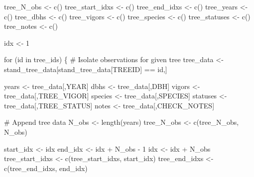 \documentclass[
  letterpaper,
  DIV=11,
  numbers=noendperiod]{scrartcl}
\newenvironment{Shaded}{\begin{snugshade}}{\end{snugshade}}
\newcommand{\CommentTok}[1]{\textcolor[rgb]{0.37,0.37,0.37}{#1}}
\newcommand{\ControlFlowTok}[1]{\textcolor[rgb]{0.00,0.23,0.31}{#1}}
\newcommand{\DecValTok}[1]{\textcolor[rgb]{0.68,0.00,0.00}{#1}}
\newcommand{\FunctionTok}[1]{\textcolor[rgb]{0.28,0.35,0.67}{#1}}
\newcommand{\NormalTok}[1]{\textcolor[rgb]{0.00,0.23,0.31}{#1}}
\newcommand{\OtherTok}[1]{\textcolor[rgb]{0.00,0.23,0.31}{#1}}
\newcommand{\SpecialCharTok}[1]{\textcolor[rgb]{0.37,0.37,0.37}{#1}}
\newcommand{\StringTok}[1]{\textcolor[rgb]{0.13,0.47,0.30}{#1}}
\begin{document}
\begin{Shaded}
\begin{Highlighting}[]
\NormalTok{tree\_N\_obs }\OtherTok{\textless{}{-}} \FunctionTok{c}\NormalTok{()}
\NormalTok{tree\_start\_idxs }\OtherTok{\textless{}{-}} \FunctionTok{c}\NormalTok{()}
\NormalTok{tree\_end\_idxs }\OtherTok{\textless{}{-}} \FunctionTok{c}\NormalTok{()}
\NormalTok{tree\_years }\OtherTok{\textless{}{-}} \FunctionTok{c}\NormalTok{()}
\NormalTok{tree\_dbhs }\OtherTok{\textless{}{-}} \FunctionTok{c}\NormalTok{()}
\NormalTok{tree\_vigors }\OtherTok{\textless{}{-}} \FunctionTok{c}\NormalTok{()}
\NormalTok{tree\_species }\OtherTok{\textless{}{-}} \FunctionTok{c}\NormalTok{()}
\NormalTok{tree\_statuses }\OtherTok{\textless{}{-}} \FunctionTok{c}\NormalTok{()}
\NormalTok{tree\_notes }\OtherTok{\textless{}{-}} \FunctionTok{c}\NormalTok{()}

\NormalTok{idx }\OtherTok{\textless{}{-}} \DecValTok{1}

\ControlFlowTok{for}\NormalTok{ (id }\ControlFlowTok{in}\NormalTok{ tree\_ids) \{}
  \CommentTok{\# Isolate observations for given tree}
\NormalTok{  tree\_data }\OtherTok{\textless{}{-}}\NormalTok{ stand\_tree\_data[stand\_tree\_data[}\StringTok{\textquotesingle{}TREEID\textquotesingle{}}\NormalTok{] }\SpecialCharTok{==}\NormalTok{ id,]}

\NormalTok{  years }\OtherTok{\textless{}{-}}\NormalTok{ tree\_data[,}\StringTok{\textquotesingle{}YEAR\textquotesingle{}}\NormalTok{]}
\NormalTok{  dbhs }\OtherTok{\textless{}{-}}\NormalTok{ tree\_data[,}\StringTok{\textquotesingle{}DBH\textquotesingle{}}\NormalTok{]}
\NormalTok{  vigors }\OtherTok{\textless{}{-}}\NormalTok{ tree\_data[,}\StringTok{\textquotesingle{}TREE\_VIGOR\textquotesingle{}}\NormalTok{]}
\NormalTok{  species }\OtherTok{\textless{}{-}}\NormalTok{ tree\_data[,}\StringTok{\textquotesingle{}SPECIES\textquotesingle{}}\NormalTok{]}
\NormalTok{  statuses }\OtherTok{\textless{}{-}}\NormalTok{ tree\_data[,}\StringTok{\textquotesingle{}TREE\_STATUS\textquotesingle{}}\NormalTok{]}
\NormalTok{  notes }\OtherTok{\textless{}{-}}\NormalTok{ tree\_data[,}\StringTok{\textquotesingle{}CHECK\_NOTES\textquotesingle{}}\NormalTok{]}

  \CommentTok{\# Append tree data}
\NormalTok{  N\_obs }\OtherTok{\textless{}{-}} \FunctionTok{length}\NormalTok{(years)}
\NormalTok{  tree\_N\_obs }\OtherTok{\textless{}{-}} \FunctionTok{c}\NormalTok{(tree\_N\_obs, N\_obs)}

\NormalTok{  start\_idx }\OtherTok{\textless{}{-}}\NormalTok{ idx}
\NormalTok{  end\_idx }\OtherTok{\textless{}{-}}\NormalTok{ idx }\SpecialCharTok{+}\NormalTok{ N\_obs }\SpecialCharTok{{-}} \DecValTok{1}
\NormalTok{  idx }\OtherTok{\textless{}{-}}\NormalTok{ idx }\SpecialCharTok{+}\NormalTok{ N\_obs}
\NormalTok{  tree\_start\_idxs }\OtherTok{\textless{}{-}} \FunctionTok{c}\NormalTok{(tree\_start\_idxs, start\_idx)}
\NormalTok{  tree\_end\_idxs }\OtherTok{\textless{}{-}} \FunctionTok{c}\NormalTok{(tree\_end\_idxs, end\_idx)}


\end{Highlighting}
\end{Shaded}
\end{document}
